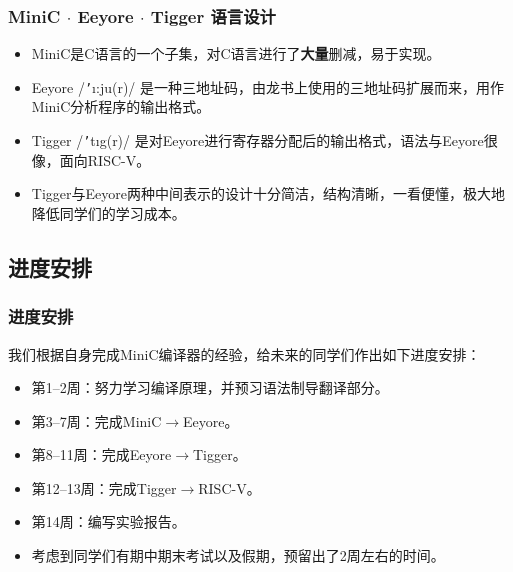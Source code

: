 \documentclass{beamer}
\begin{document}
\begin{frame}
    \frametitle{MiniC $\cdot$ Eeyore $\cdot$ Tigger 语言设计}
    \begin{itemize}
        \setlength{\itemsep}{.5cm}
        \item MiniC是C语言的一个子集，对C语言进行了\textbf{大量}删减，易于实现。

        \item Eeyore /\texttt{'}\i:ju\textschwa(r)/ 是一种三地址码，由龙书上使用的三地址码扩展而来，用作MiniC分析程序的输出格式。

        \item Tigger /\texttt{'}t\i g\textschwa(r)/ 是对Eeyore进行寄存器分配后的输出格式，语法与Eeyore很像，面向RISC-V。
    
        \item Tigger与Eeyore两种中间表示的设计十分简洁，结构清晰，一看便懂，极大地降低同学们的学习成本。
    \end{itemize}
\end{frame}


\subsection{进度安排}

\begin{frame}
    \frametitle{进度安排}
    我们根据自身完成MiniC编译器的经验，给未来的同学们作出如下进度安排：
    \begin{itemize}
        \item 第1--2周：努力学习编译原理，并预习语法制导翻译部分。

        \item 第3--7周：完成MiniC$\rightarrow$Eeyore。

        \item 第8--11周：完成Eeyore$\rightarrow$Tigger。

        \item 第12--13周：完成Tigger$\rightarrow$RISC-V。

        \item 第14周：编写实验报告。

        \item 考虑到同学们有期中期末考试以及假期，预留出了2周左右的时间。
    \end{itemize}
\end{frame}
\end{document}
